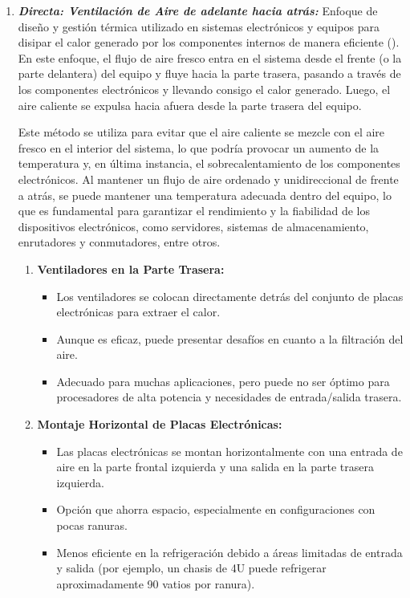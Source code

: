 \begin{enumerate}[label=\alph*)]
    \needspace{3cm}
    \begin{enumerate}[label=\Roman*)]
    \item \textbf{\textit{Directa: Ventilación de Aire de adelante hacia atrás:}} Enfoque de diseño y gestión térmica utilizado en sistemas electrónicos y equipos para disipar el calor generado por los componentes internos de manera eficiente (\cite{Group_2017}). En este enfoque, el flujo de aire fresco entra en el sistema desde el frente (o la parte delantera) del equipo y fluye hacia la parte trasera, pasando a través de los componentes electrónicos y llevando consigo el calor generado. Luego, el aire caliente se expulsa hacia afuera desde la parte trasera del equipo.

    Este método se utiliza para evitar que el aire caliente se mezcle con el aire fresco en el interior del sistema, lo que podría provocar un aumento de la temperatura y, en última instancia, el sobrecalentamiento de los componentes electrónicos. Al mantener un flujo de aire ordenado y unidireccional de frente a atrás, se puede mantener una temperatura adecuada dentro del equipo, lo que es fundamental para garantizar el rendimiento y la fiabilidad de los dispositivos electrónicos, como servidores, sistemas de almacenamiento, enrutadores y conmutadores, entre otros.

        \needspace{3cm}
        \begin{enumerate}[label=\alph*)]
        \item \textbf{Ventiladores en la Parte Trasera:}
        \begin{itemize}
            \item Los ventiladores se colocan directamente detrás del conjunto de placas electrónicas para extraer el calor.
            \item Aunque es eficaz, puede presentar desafíos en cuanto a la filtración del aire.
            \item Adecuado para muchas aplicaciones, pero puede no ser óptimo para procesadores de alta potencia y necesidades de entrada/salida trasera.
        \end{itemize}
    
        \item \textbf{Montaje Horizontal de Placas Electrónicas:}
        \begin{itemize}
            \item Las placas electrónicas se montan horizontalmente con una entrada de aire en la parte frontal izquierda y una salida en la parte trasera izquierda.
            \item Opción que ahorra espacio, especialmente en configuraciones con pocas ranuras.
            \item Menos eficiente en la refrigeración debido a áreas limitadas de entrada y salida (por ejemplo, un chasis de 4U puede refrigerar aproximadamente 90 vatios por ranura).
        \end{itemize}
    

\end{enumerate}
\end{enumerate}
\end{enumerate}
